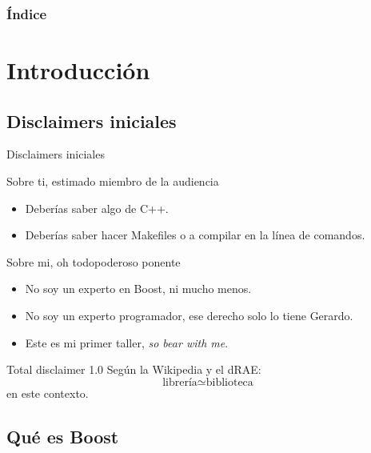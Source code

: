 \documentclass[8pt,xcolor=svgnames]{beamer}
\begin{document}
\begin{frame}
  \titlepage
\end{frame}

\normalsize

\begin{frame}
  \frametitle{Índice} 
  \tableofcontents
\end{frame}


\section{Introducción}

\subsection{Disclaimers iniciales}

\begin{frame}{Disclaimers iniciales}
  \begin{block}{Sobre ti, estimado miembro de la audiencia}
    \begin{itemize}
    \item Deberías saber algo de C++.
    \item Deberías saber hacer Makefiles o a compilar en la línea de comandos.
    \end{itemize}     
  \end{block}

  \pause

  \begin{block}{Sobre mi, oh todopoderoso ponente}
    \begin{itemize}
    \item No soy un experto en Boost, ni mucho menos.
    \item No soy un experto programador, ese derecho solo lo tiene Gerardo.
    \item Este es mi primer taller, \textit{so bear with me}.
    \end{itemize}
  \end{block}

  \pause
  \begin{alertblock}{Total disclaimer 1.0}
    Según la Wikipedia y el dRAE:
    \[
    \textrm{librería} \simeq \textrm{biblioteca} 
    \]
    en este contexto.
  \end{alertblock}
\end{frame}

\subsection{Qué es Boost}
\end{document}
